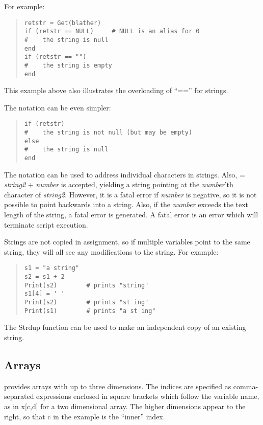 For example:

\begin{quote}
\begin{verbatim}
retstr = Get(blather)
if (retstr == NULL)     # NULL is an alias for 0
#    the string is null
end
if (retstr == "")
#    the string is empty
end
\end{verbatim}
\end{quote}

This example above also illustrates the overloading of ``{\vt ==}''
for strings.

The notation can be even simpler:
\begin{quote}
\begin{verbatim}
if (retstr)
#    the string is not null (but may be empty)
else
#    the string is null
end
\end{verbatim}
\end{quote}

The {\vt []} notation can be used to address individual characters in
strings.  Also, { = {\it string2\/} + {\it
number\/}} is accepted, yielding a string pointing at the {\it
number\/}'th character of {\it string2\/}.  However, it is a fatal
error if {\it number} is negative, so it is not possible to point
backwards into a string.  Also, if the {\it number} exceeds the text
length of the string, a fatal error is generated.  A fatal error is an
error which will terminate script execution.

Strings are not copied in assignment, so if multiple variables
point to the same string, they will all see any modifications to
the string.  For example:
\begin{quote}
\begin{verbatim}
s1 = "a string"
s2 = s1 + 2
Print(s2)        # prints "string"
s1[4] = ' '
Print(s2)        # prints "st ing"
Print(s1)        # prints "a st ing"
\end{verbatim}
\end{quote}

The {\vt Strdup} function can be used to make an independent copy of
an existing string.

\subsection{Arrays}
\label{arrayvars}

{\Xic} provides arrays with up to three dimensions.  The indices are
specified as comma-separated expressions enclosed in square brackets
which follow the variable name, as in {\vt x[c,d]} for a two
dimensional array.  The higher dimensions appear to the right, so that
{\vt c} in the example is the ``inner'' index.

